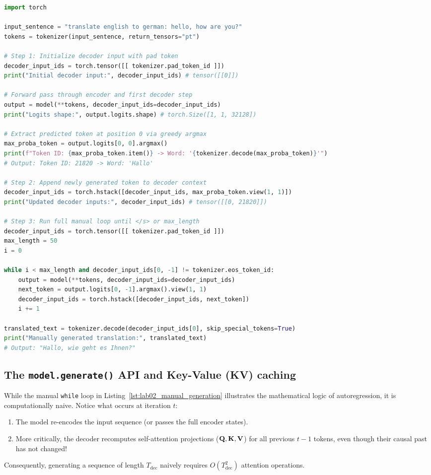 \documentclass[../labs.tex]{subfiles}
\begin{document}
\begin{lstlisting}[language=Python, caption={Step-by-step manual autoregressive decoding implementation (Cells 69--85).}, label={lst:lab02_manual_generation}]
import torch

input_sentence = "translate english to german: hello, how are you?"
tokens = tokenizer(input_sentence, return_tensors="pt")

# Step 1: Initialize decoder input with pad token
decoder_input_ids = torch.tensor([[ tokenizer.pad_token_id ]])
print("Initial decoder input:", decoder_input_ids) # tensor([[0]])

# Forward pass through encoder and first decoder step
output = model(**tokens, decoder_input_ids=decoder_input_ids)
print("Logits shape:", output.logits.shape) # torch.Size([1, 1, 32128])

# Extract predicted token at position 0 via greedy argmax
max_proba_token = output.logits[0, 0].argmax()
print(f"Token ID: {max_proba_token.item()} -> Word: '{tokenizer.decode(max_proba_token)}'")
# Output: Token ID: 21820 -> Word: 'Hallo'

# Step 2: Append newly generated token to decoder context
decoder_input_ids = torch.hstack([decoder_input_ids, max_proba_token.view(1, 1)])
print("Updated decoder inputs:", decoder_input_ids) # tensor([[0, 21820]])

# Step 3: Run full manual loop until </s> or max_length
decoder_input_ids = torch.tensor([[ tokenizer.pad_token_id ]])
max_length = 50
i = 0

while i < max_length and decoder_input_ids[0, -1] != tokenizer.eos_token_id:
    output = model(**tokens, decoder_input_ids=decoder_input_ids)
    next_token = output.logits[0, -1].argmax().view(1, 1)
    decoder_input_ids = torch.hstack([decoder_input_ids, next_token])
    i += 1

translated_text = tokenizer.decode(decoder_input_ids[0], skip_special_tokens=True)
print("Manually generated translation:", translated_text)
# Output: "Hallo, wie geht es Ihnen?"
\end{lstlisting}

\subsection{The \texttt{model.generate()} API and Key-Value (KV) caching}

While the manual \texttt{while} loop in Listing~\ref{lst:lab02_manual_generation} illustrates the mathematical logic of autoregression, it is computationally naive. Notice what occurs at iteration $t$:
\begin{enumerate}
    \item The model re-encodes the input sequence (or passes the full encoder states).
    \item More critically, the decoder recomputes self-attention projections ($\mathbf{Q}, \mathbf{K}, \mathbf{V}$) for all previous $t-1$ tokens, even though their causal past has not changed!
\end{enumerate}
Consequently, generating a sequence of length $T_{\text{dec}}$ naively requires $O(T_{\text{dec}}^2)$ attention operations.
\end{document}
